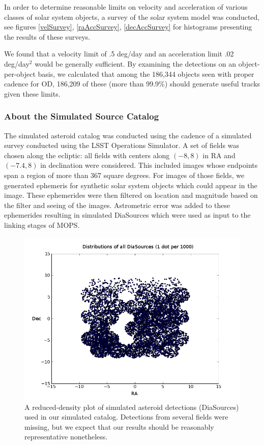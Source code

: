 \documentclass[12pt,preprint]{aastex}
\begin{document}
In order to determine reasonable limits on velocity and acceleration
of various classes of solar system objects, a survey of the solar
system model \citep{Grav2011} was conducted, see figures
\ref{velSurvey}, \ref{raAccSurvey}, \ref{decAccSurvey} for histograms
presenting the results of these surveys.

We found that a velocity limit of .5 deg/day and an acceleration limit
.02 deg/day$^2$ would be generally sufficient.  By examining the
detections on an object-per-object basis, we calculated that among the
186,344 objects seen with proper cadence for OD, 186,209 of these
(more than 99.9\%) should generate useful tracks given these limits.



\subsubsection{About the Simulated Source Catalog}
\label{sourceCatalog}
The simulated asteroid catalog was conducted using the cadence of a
simulated survey conducted using the LSST Operations Simulator.  A set
of fields was chosen along the ecliptic: all fields with centers along
$(-8, 8)$ in RA and $(-7.4, 8)$ in declination were considered.  This
included images whose endpoints span a region of more than 367 square
degrees. For images of those fields, we generated ephemeris for
synthetic solar system objects which could appear in the image.  These
ephemerides were then filtered on location and magnitude based on the
filter and seeing of the images.  Astrometric error was added to these
ephemerides resulting in simulated DiaSources which were used as input
to the linking stages of MOPS.


\begin{figure}[ht!]
\centering
\includegraphics[scale=.7]{illustrations/allDias_1_1000th_density.png}
\caption{A reduced-density plot of simulated asteroid detections (DiaSources) used in our simulated catalog.  Detections from several fields were missing, but we expect that our results should be reasonably representative nonetheless.}
\label{diasPlot}
\end{figure}
\end{document}
